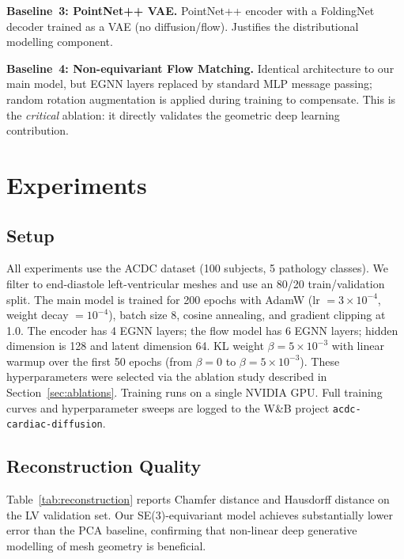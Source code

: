 \documentclass{article}
\begin{document}
\textbf{Baseline~3: PointNet++ VAE.}
PointNet++ encoder with a FoldingNet decoder trained as a VAE
(no diffusion/flow).
Justifies the distributional modelling component.

\textbf{Baseline~4: Non-equivariant Flow Matching.}
Identical architecture to our main model, but EGNN layers replaced by
standard MLP message passing; random rotation augmentation is applied
during training to compensate.
This is the \emph{critical} ablation: it directly validates the
geometric deep learning contribution.

\section{Experiments}
\label{sec:experiments}

\subsection{Setup}

All experiments use the ACDC dataset (100 subjects, 5 pathology classes).
We filter to end-diastole left-ventricular meshes and use an 80/20
train/validation split.
The main model is trained for 200 epochs with AdamW (lr $= 3 \times 10^{-4}$,
weight decay $= 10^{-4}$), batch size 8, cosine annealing, and gradient
clipping at 1.0.
The encoder has 4 EGNN layers; the flow model has 6 EGNN layers; hidden
dimension is 128 and latent dimension 64.
KL weight $\beta = 5 \times 10^{-3}$ with linear warmup over the first 50
epochs (from $\beta=0$ to $\beta=5\times10^{-3}$).
These hyperparameters were selected via the ablation study described in
Section~\ref{sec:ablations}.
Training runs on a single NVIDIA GPU.
Full training curves and hyperparameter sweeps are logged to the W\&B project
\texttt{acdc-cardiac-diffusion}.

\subsection{Reconstruction Quality}

Table~\ref{tab:reconstruction} reports Chamfer distance and Hausdorff distance
on the LV validation set.
Our SE(3)-equivariant model achieves substantially lower error than the PCA
baseline, confirming that non-linear deep generative modelling of mesh geometry
is beneficial.
\end{document}
